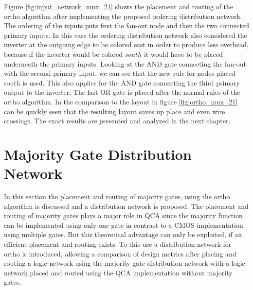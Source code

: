 Figure \ref{fig:input_network_mux_21} shows the placement and routing of the ortho algorithm after implementing the proposed ordering distribution network. The ordering of the inputs puts first the fan-out node and then the two connected primary inputs. In this case the ordering distribution network also considered the inverter at the outgoing edge to be colored east in order to produce less overhead, because if the inverter would be colored $south$ it would have to be placed underneath the primary inputs. Looking at the AND gate connecting the fan-out with the second primary input, we can see that the new rule for nodes placed south is used. This also applies for the AND gate connecting the third primary output to the inverter. The last OR gate is placed after the normal rules of the ortho algorithm. In the comparison to the layout in figure \ref{fig:ortho_mux_21} can be quickly seen that the resulting layout saves up place and even wire crossings. The exact results are presented and analyzed in the next chapter.

\section{Majority Gate Distribution Network}
In this section the placement and routing of majority gates, using the ortho algorithm is discussed and a distribution network is proposed. The placement and routing of majority gates plays a major role in QCA since the majority function can be implemented using only one gate in contrast to a CMOS implementation using multiple gates. But this theoretical advantage can only be exploited, if an efficient placement and routing exists. To this use a distribution network for ortho is introduced, allowing a comparison of design metrics after placing and routing a logic network using the majority gate distribution network with a logic network placed and routed using the QCA implementation without majority gates.

